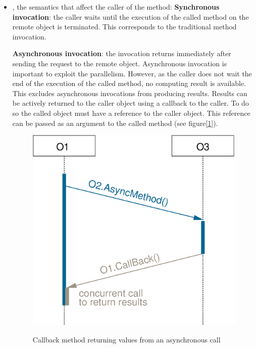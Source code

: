 \begin{itemize}

\item {}, the semantics that affect the caller
of the method:
	\subitem \textbf{Synchronous invocation}: the caller waits until the
	execution of the called method on the remote object is terminated.
  This corresponds to the traditional method invocation.

	\subitem \textbf{Asynchronous invocation}: the invocation returns
	immediately after sending the request to the remote object.
	Asynchronous invocation is important to exploit the parallelism.
	However, as the caller does not wait the end of the execution of the
	called method, no computing result is available. This excludes
	asynchronous invocations from producing results. Results can be
	actively returned to the caller object using a callback to the caller.
	To do so the called object must have a reference to the caller object.
	This reference can be passed as an argument to the called method
	(see figure[\ref{fig_inv_async}]).




\begin{figure}[ht]
	\caption{Callback method returning values from an asynchronous call}
  	\centering
	\includegraphics[scale=0.5]{fig_inv_async.eps}
	\label{fig_inv_async}
\end{figure}




\end{itemize}
